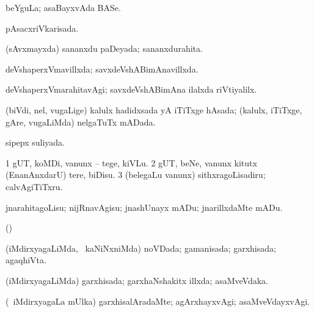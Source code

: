 {{\noindent 
\gl{\pagu}
\expl{}
\bmng
{} beYguLa; asaBayxvAda BASe. 
\emng
\eentry

\bentry
{} 
\gl{\gu}
\expl{}
\bmng
pAsacxriVkarisada. 
\emng
\eentry

\bentry
{} 
\gl{\gu}
\expl{}
\bmng
(sAvxmayxda) sananxdu paDeyada; sananxdurahita. 
\emng
\eentry

\bentry
{} 
\gl{\gu}
\expl{}
\bmng
deVshaperxVmavillxda; savxdeVshABimAnavillxda. 
\emng
\eentry

\bentry
{} 
\gl{\kirxvi}
\expl{}
\bmng
deVshaperxVmarahitavAgi; savxdeVshABimAna ilalxda riVtiyalilx. 
\emng
\eentry

\bentry
{} 
\gl{\gu}
\bmng
(biVdi, nel, \mo vugaLige) kalulx hadidxsada yA iTiTxge hAsada; (kalulx, iTiTxge, gAre, \mo vugaLiMda) nelgaTuTx mADada. 
\emng
\eentry

\bentry
{} 
\gl{\gu}
\bmng
sipepx suliyada. 
\emng
\eentry

\bentry
{} 
\gl{\sakirx}
\bmng
\bnum
\num{1} gUT, koMDi, \mo vanunx -- tege, kiVLu. 
\num{2} gUT, beNe, \mo vanunx kitutx (EnanAnxdarU) tere, biDisu. 
\num{3} (belegaLu \mo vanunx) sithxragoLisadiru; calvAgiTiTxru. 
\enum
\emng
\eentry

\bentry
{} 
\gl{\sakirx}
\expl{}
\bmng
jnarahitagoLisu; nijRnavAgisu; jnashUnayx mADu; jnarillxdaMte mADu. 
\emng
\eentry

\bentry
{} 
\gl{\nA}
\expl{}
\bmng
(\bava)  
\emng
\eentry

\bentry
{} 
\gl{\gu}
\expl{}
\bmng
(iMdirxyagaLiMda, \kanmu\ kaNiNxniMda) noVDada; gamanisada; garxhisada; agaqhiVta. 
\emng
\eentry

\bentry
{} 
\gl{\gu}
\expl{}
\bmng
(iMdirxyagaLiMda) garxhisada; garxhaNshakitx illxda; asaMveVdaka. 
\emng
\eentry

\bentry
{} 
\gl{\kirxvi}
\expl{}
\bmng
(\kanmu\ iMdirxyagaLa mUlka) garxhisalAradaMte; agArxhayxvAgi; asaMveVdayxvAgi. 
\emng
\eentry

}}
